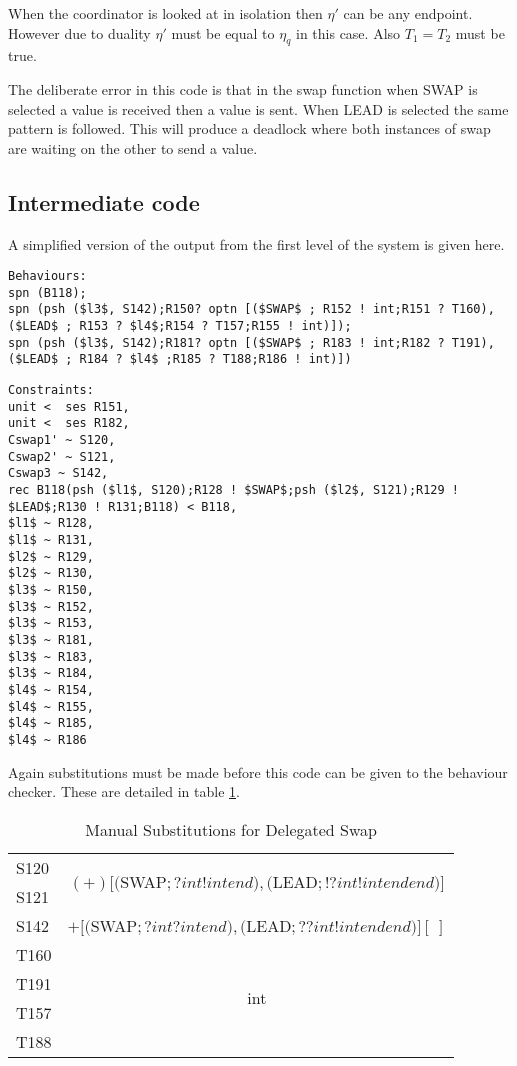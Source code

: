 When the coordinator is looked at in isolation then $\eta'$ can be any endpoint. However due to duality $\eta'$ must be equal to $\eta_q$ in this case. Also $T_1 = T_2$ must be true.

The deliberate error in this code is that in the swap function when SWAP is selected a value is received then a value is sent. When LEAD is selected the same pattern is followed. This will produce a deadlock where both instances of swap are waiting on the other to send a value. 

\subsection{Intermediate code}

A simplified version of the output from the first level of the system is given here. 

\begin{lstlisting}
Behaviours:
spn (B118);
spn (psh ($l3$, S142);R150? optn [($SWAP$ ; R152 ! int;R151 ? T160), ($LEAD$ ; R153 ? $l4$;R154 ? T157;R155 ! int)]);
spn (psh ($l3$, S142);R181? optn [($SWAP$ ; R183 ! int;R182 ? T191), ($LEAD$ ; R184 ? $l4$ ;R185 ? T188;R186 ! int)])

\end{lstlisting}
\begin{lstlisting}
Constraints:
unit <  ses R151,
unit <  ses R182,
Cswap1' ~ S120,
Cswap2' ~ S121,
Cswap3 ~ S142,
rec B118(psh ($l1$, S120);R128 ! $SWAP$;psh ($l2$, S121);R129 ! $LEAD$;R130 ! R131;B118) < B118,
$l1$ ~ R128,
$l1$ ~ R131,
$l2$ ~ R129,
$l2$ ~ R130,
$l3$ ~ R150,
$l3$ ~ R152,
$l3$ ~ R153,
$l3$ ~ R181,
$l3$ ~ R183,
$l3$ ~ R184,
$l4$ ~ R154,
$l4$ ~ R155,
$l4$ ~ R185,
$l4$ ~ R186
\end{lstlisting}

Again substitutions must be made before this code can be given to the behaviour checker. These are detailed in table \ref{subs2}.

\begin{table}
\centering
\begin{tabular}{l |c}
S120 & \multirow{2}{*}{$(+) [($SWAP$; ? int ! int end ), ($LEAD$; ! ? int ! int end end)]$} \\
S121 & \\ \hline
S142 & $+ [($SWAP$; ? int ? int end), ($LEAD$; ? ? int ! int end end)] [\ ]$ \\ \hline
T160 & \multirow{4}{*}{int} \\
T191 & \\ 
T157 & \\
T188 & \\ 
\end{tabular}
\caption{Manual Substitutions for Delegated Swap}
\label{subs2}
\end{table}

